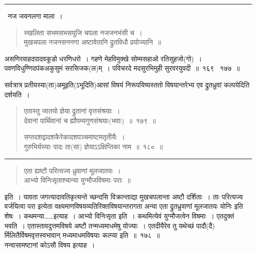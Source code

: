 \documentclass[11pt, openany]{book}
\begin{document}
\hrule

\begin{center}
 \textendash\ नज जयनलगा माला~। 
\end{center}

\begin{quote}
{\qt स्खलिता सभमसभसयुजि चपला नजजनभंसी च~।\\
मुखचपला नजनसननगा अष्टावेतानि द्रुतविधौ प्रयोज्यानि~॥}
\end{quote}

\begin{sloppypar}
\noindent
{\qtt असणिरवाहदपादवकूडो धरणिधरो~। गहणे मेहविमुक्खे सोम्मसहाओ रतिसुहजो(गो)~। पवणविधुण्णिदपंकअकुसुमं सरसिजक(ल)म्~। पविचरदे मदसुरभिमुही सुरवरयुवदी~॥~१६९ \textendash\ १७७~॥}\\
\end{sloppypar}

सर्वत्रात्र प्रतीयस्या(ता)अमूइति(ऽभूदिति)आसां विषयं निरूपयिष्यस्ततो विषयान्तरेभ्य एव द्रुतध्रुवां कल्पयेदिति दर्शयति~।

\newpage

\begin{quote}
{\na एतास्तु जातयो ज्ञेया द्रुतानां वृत्तसंश्रयाः~।\\
देवानां पार्थिवानां च ह्यौपम्यगुणसंश्रयाः(भवाः)~॥~१७९~॥

सप्तदशद्वादशकैरेकादशपञ्चमाष्टमतृतीयैः~।\\
गुरुभिर्यस्याः पादः ता(सा) ज्ञेयाऽऽक्षिप्तिका नाम~॥~१८०~॥}
\end{quote}

\hrule

\begin{quote}
{\qt एता ह्यष्टौ परित्यज्य ध्रुवाणां मूलजातयः~।\\
आभ्यो विनिःसृताश्चान्या युग्मौजविषमाः पराः~॥}
\end{quote}

\noindent
इति~। यावता जगत्यादावतिकृत्यन्ते च्छन्दसि विक्रान्ताद्या मुखचपलान्ता अष्टौ दर्शिताः~। ताः {\qtt परित्यज्य} वर्जयित्वा {\qtt परा इत्येता} वक्ष्यमाणविषयव्यतिरिक्तविषयान्तरागता अन्या {\qtt एता द्रुतध्रुवाणां मूलजातयः} योनिः इति शेषः~। {\qtt कथमन्या}\ldots \ldots इत्याह~। {\qtt आभ्यो विनिःसृता} इति~। कथमित्येवं {\qtt युग्मौजत्वेन विषमाः}~। एतदुक्तं भवति~। एतास्तावदुत्तमविषये अष्टौ तन्मध्यमाधमेषु योज्याः~। एतदीयैरेव तु यथेच्छं पादौ(दै) र्मिलितैर्विषमवृत्तस्वभावान् मध्यमाधमविषयाः कल्प्या इति~॥~१७८~॥\\

नन्वासामष्टानां कोऽसौ विषय इत्याह~।
\end{document}
